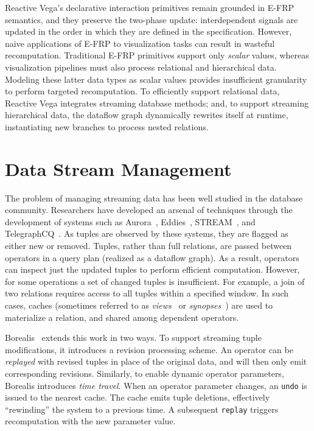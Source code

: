 Reactive Vega's declarative interaction primitives remain grounded in E-FRP
semantics, and they preserve the two-phase update: interdependent signals are
updated in the order in which they are defined in the specification. However,
naive applications of E-FRP to visualization tasks can result in wasteful
recomputation. Traditional E-FRP primitives support only \emph{scalar} values,
whereas visualization pipelines must also process relational and hierarchical
data. Modeling these latter data types as scalar values provides insufficient
granularity to perform targeted recomputation. To efficiently support relational
data, Reactive Vega integrates streaming database methods; and, to support
streaming hierarchical data, the dataflow graph dynamically rewrites itself at
runtime, instantiating new branches to process nested relations.

\section{Data Stream Management}

The problem of managing streaming data has been well studied in the database
community. Researchers have developed an arsenal of techniques through the
development of systems such as Aurora~\cite{abadi:aurora},
Eddies~\cite{avnur:eddies}, STREAM~\cite{arasu:stream}, and
TelegraphCQ~\cite{chandrasekaran:telegraphcq}. As tuples are observed by these
systems, they are flagged as either new or removed. Tuples, rather than full
relations, are passed between operators in a query plan (realized as a dataflow
graph). As a result, operators can inspect just the updated tuples to perform
efficient computation. However, for some operations a set of changed tuples is
insufficient. For example, a join of two relations requires access to all tuples
within a specified window. In such cases, caches (sometimes referred to as
\emph{views}~\cite{abadi:aurora} or \emph{synopses}~\cite{arasu:stream}) are
used to materialize a relation, and shared among dependent operators.

Borealis~\cite{abadi:borealis} extends this work in two ways. To support
streaming tuple modifications, it introduces a revision processing scheme. An
operator can be \emph{replayed} with revised tuples in place of the original
data, and will then only emit corresponding revisions. Similarly, to enable
dynamic operator parameters, Borealis introduces \emph{time travel}. When an
operator parameter changes, an \texttt{undo} is issued to the nearest cache. The
cache emits tuple deletions, effectively ``rewinding'' the system to a previous
time. A subsequent \texttt{replay} triggers recomputation with the new parameter
value.

